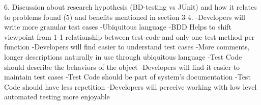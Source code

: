 6. Discussion about research hypothesis (BD-testing vs JUnit) and how it relates to problems found (5) and benefits mentioned in section 3-4.
    -Developers will write more granular test cases
        -Ubiquitous language
        -BDD Helps to shift viewpoint from 1-1 relationship between test-code and only one test method per function
    -Developers will find easier to understand test cases
        -More comments, longer descriptions naturally in use through ubiquitous language
        -Test Code should describe the behaviors of the object
    -Developers will find it easier to maintain test cases
         -Test Code should be part of system’s documentation
         -Test Code should have less repetition
    -Developers will perceive working with low level automated testing more enjoyable
